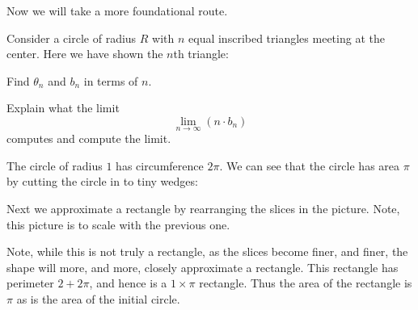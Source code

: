 \documentclass[hints,handout,noauthor,nooutcomes,12pt]{ximera}
\begin{document}
Now we will take a more foundational route.


\begin{problem}
Consider a circle of radius $R$ with $n$ equal inscribed triangles
meeting at the center.  Here we have shown the $n$th triangle:
\begin{image}
\end{image}
Find $\theta_n$ and $b_n$ in terms of $n$.
\end{problem}


\begin{problem}
Explain what the limit
\[
\lim_{n\to\infty} \left(n\cdot b_n\right)
\]
computes and compute the limit.
\end{problem}



The circle of radius $1$ has circumference $2\pi$. We can see that the
circle has area $\pi$ by cutting the circle in to tiny wedges:
\begin{image}
\end{image}

Next we approximate a rectangle by rearranging the slices in the
picture. Note, this picture is to scale with the previous one.
\begin{image}
\end{image}
Note, while this is not truly a rectangle, as the slices become finer,
and finer, the shape will more, and more, closely approximate a
rectangle. This rectangle has perimeter $2+2\pi$, and hence is a
$1\times \pi$ rectangle. Thus the area of the rectangle is $\pi$ as is
the area of the initial circle.
\end{document}
